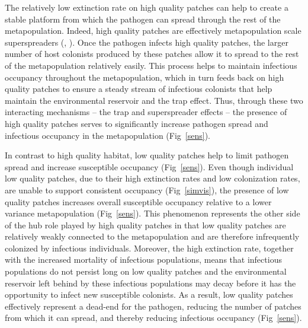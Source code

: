 \documentclass{article}
\begin{document}
The relatively low extinction rate on high quality patches can help to create a stable platform from which the pathogen can spread through the rest of the metapopulation.  Indeed, high quality patches are effectively metapopulation scale superspreaders (\cite{Lloyd-Smith2005}, \cite{Paull2012}).  Once the pathogen infects high quality patches, the larger number of host colonists produced by these patches allow it to spread to the rest of the metapopulation relatively easily.  This process helps to maintain infectious occupancy throughout the metapopulation, which in turn feeds back on high quality patches to ensure a steady stream of infectious colonists that help maintain the environmental reservoir and the trap effect.  Thus, through these two interacting mechanisms -- the trap and superspreader effects -- the presence of high quality patches serves to significantly increase pathogen spread and infectious occupancy in the metapopulation (Fig~\ref{sens}).  

In contrast to high quality habitat, low quality patches help to limit pathogen spread and increase susceptible occupancy (Fig~\ref{sens}). Even though individual low quality patches, due to their high extinction rates and low colonization rates, are unable to support consistent occupancy (Fig~\ref{simvis}), the presence of low quality patches increases overall susceptible occupancy relative to a lower variance metapopulation (Fig~\ref{sens}).  This phenomenon represents the other side of the hub role played by high quality patches in that low quality patches are relatively weakly connected to the metapopulation and are therefore infrequently colonized by infectious individuals.  Moreover, the high extinction rate, together with the increased mortality of infectious populations, means that infectious populations do not persist long on low quality patches and the environmental reservoir left behind by these infectious populations may decay before it has the opportunity to infect new susceptible colonists.  As a result, low quality patches effectively represent a dead-end for the pathogen, reducing the number of patches from which it can spread, and thereby reducing infectious occupancy (Fig~\ref{sens}). 
\end{document}
